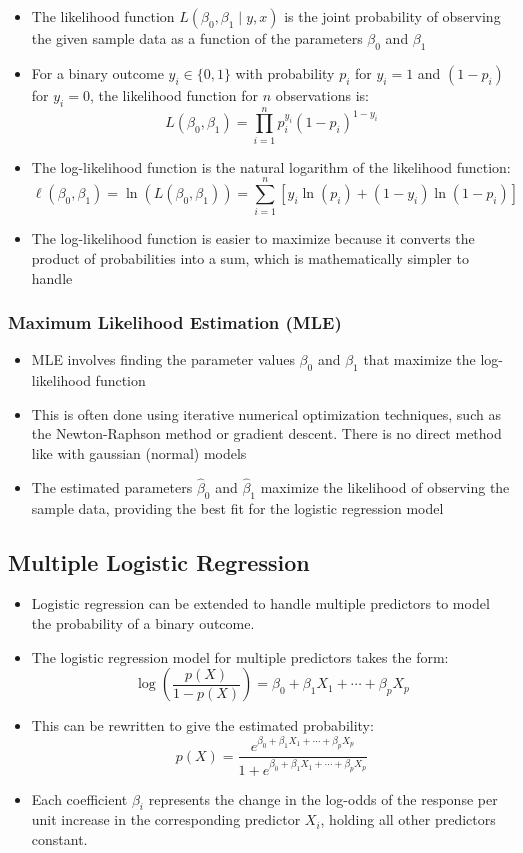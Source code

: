 \documentclass{article}
\begin{document}
\begin{itemize}
    \item The likelihood function $L(\beta_0, \beta_1 \mid y, x)$ is the joint probability of observing the given sample data as a function of the parameters $\beta_0$ and $\beta_1$
    \item For a binary outcome $y_i \in \{0,1\}$ with probability $p_i$ for $y_i=1$ and $(1-p_i)$ for $y_i=0$, the likelihood function for $n$ observations is:
    \[
    L(\beta_0, \beta_1) = \prod_{i=1}^{n} p_i^{y_i} (1-p_i)^{1-y_i}
    \]
    \item The log-likelihood function is the natural logarithm of the likelihood function:
    \[
    \ell(\beta_0, \beta_1) = \ln(L(\beta_0, \beta_1)) = \sum_{i=1}^{n} \left[ y_i \ln(p_i) + (1-y_i) \ln(1-p_i) \right]
    \]
    \item The log-likelihood function is easier to maximize because it converts the product of probabilities into a sum, which is mathematically simpler to handle
\end{itemize}

\subsubsection{Maximum Likelihood Estimation (MLE)}

\begin{itemize}
    \item MLE involves finding the parameter values $\beta_0$ and $\beta_1$ that maximize the log-likelihood function
    \item This is often done using iterative numerical optimization techniques, such as the Newton-Raphson method or gradient descent. There is no direct method like with gaussian (normal) models
    \item The estimated parameters $\hat{\beta}_0$ and $\hat{\beta}_1$ maximize the likelihood of observing the sample data, providing the best fit for the logistic regression model
\end{itemize}

\subsection{Multiple Logistic Regression}

\begin{itemize}
    \item Logistic regression can be extended to handle multiple predictors to model the probability of a binary outcome.
    \item The logistic regression model for multiple predictors takes the form:
    \[
    \log \left(\frac{p(X)}{1-p(X)}\right) = \beta_0 + \beta_1 X_1 + \cdots + \beta_p X_p
    \]
    \item This can be rewritten to give the estimated probability:
    \[
    p(X) = \frac{e^{\beta_0 + \beta_1 X_1 + \cdots + \beta_p X_p}}{1 + e^{\beta_0 + \beta_1 X_1 + \cdots + \beta_p X_p}}
    \]
    \item Each coefficient $\beta_i$ represents the change in the log-odds of the response per unit increase in the corresponding predictor $X_i$, holding all other predictors constant.
\end{itemize}
\end{document}
